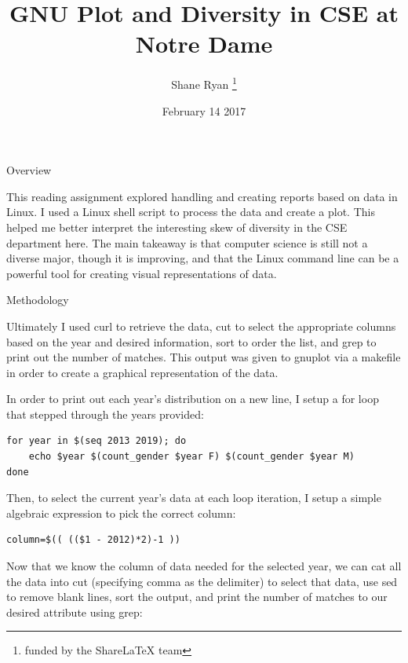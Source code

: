 \documentclass[12pt, letterpaper, twoside]{article}
\title{GNU Plot and Diversity in CSE at Notre Dame}
\author{Shane Ryan \thanks{funded by the ShareLaTeX team}}
\date{February 14 2017}
\begin{document}
\begin{titlepage}
\maketitle
\end{titlepage}


{\centering\large Overview\par}

This reading assignment explored handling and creating reports based on data in Linux.  I used a Linux shell script to process the data and create a plot.  This helped me better interpret the interesting skew of diversity in the CSE department here. The main takeaway is that computer science is still not a diverse major, though it is improving, and that the Linux command line can be a powerful tool for creating visual representations of data. \par


{\centering\large Methodology\par}


Ultimately I used curl to retrieve the data, cut to select the appropriate columns based on the year and desired information, sort to order the list, and grep to print out the number of matches.  This output was given to gnuplot via a makefile in order to create a graphical representation of the data.\par

In order to print out each year's distribution on a new line, I setup a for loop that stepped through the years provided:


\begin{lstlisting}
for year in $(seq 2013 2019); do                                                                                 
    echo $year $(count_gender $year F) $(count_gender $year M)
done                
\end{lstlisting}

Then, to select the current year's data at each loop iteration, I setup a simple algebraic expression to pick the correct column:

\begin{lstlisting}
column=$(( (($1 - 2012)*2)-1 ))
\end{lstlisting}

Now that we know the column of data needed for the selected year, we can cat all the data into cut (specifying comma as the delimiter) to select that data, use sed to remove blank lines, sort the output, and print the number of matches to our desired attribute using grep:
\end{document}

